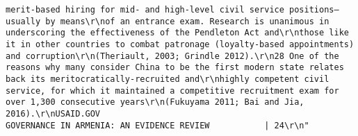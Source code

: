 \documentclass[
]{article}
\begin{document}
\begin{verbatim}
merit-based hiring for mid- and high-level civil service positions—usually by means\r\nof an entrance exam. Research is unanimous in underscoring the effectiveness of the Pendleton Act and\r\nthose like it in other countries to combat patronage (loyalty-based appointments) and corruption\r\n(Theriault, 2003; Grindle 2012).\r\n28 One of the reasons why many consider China to be the first modern state relates back its meritocratically-recruited and\r\nhighly competent civil service, for which it maintained a competitive recruitment exam for over 1,300 consecutive years\r\n(Fukuyama 2011; Bai and Jia, 2016).\r\nUSAID.GOV                                                            GOVERNANCE IN ARMENIA: AN EVIDENCE REVIEW           | 24\r\n"                                                                                                                                                                                                                                                                                                                                                                                                                                                                                                                                                                                                                                                                                                                                                                                                                                                                                                                                                                                                           

\end{verbatim}
\end{document}
